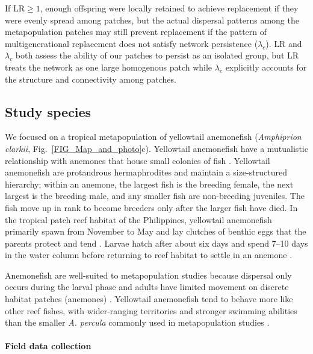 \documentclass[12pt, oneside]{article}   	%
\begin{document}
If $\text{LR} \geq 1$, enough offspring were locally retained to achieve replacement if they were evenly spread among patches, but the actual dispersal patterns among the metapopulation patches may still prevent replacement if the pattern of multigenerational replacement does not satisfy network persistence ($\lambda_c$). LR and $\lambda_c$ both assess the ability of our patches to persist as an isolated group, but LR treats the network as one large homogenous patch while $\lambda_c$ explicitly accounts for the structure and connectivity among patches.  

\subsection*{Study species}

We focused on a tropical metapopulation of yellowtail anemonefish (\textit{Amphiprion clarkii}, Fig.\ \ref{FIG_Map_and_photo}c). Yellowtail anemonefish have a mutualistic relationship with anemones that house small colonies of fish \citep{buston2003social, fautin1992field}. Yellowtail anemonefish are protandrous hermaphrodites and maintain a size-structured hierarchy; within an anemone, the largest fish is the breeding female, the next largest is the breeding male, and any smaller fish are non-breeding juveniles. The fish move up in rank to become breeders only after the larger fish have died. In the tropical patch reef habitat of the Philippines, yellowtail anemonefish primarily spawn from November to May and lay clutches of benthic eggs that the parents protect and tend \citep{ochi1989mating, holtswarth2017fecundity}. Larvae hatch after about six days and spend 7--10 days in the water column before returning to reef habitat to settle in an anemone \citep{fautin1992field}.

Anemonefish are well-suited to metapopulation studies because dispersal only occurs during the larval phase and adults have limited movement on discrete habitat patches (anemones) \citep[e.g.,][]{buston2013marine, salles_coral_2015, almany2017larval}. Yellowtail anemonefish tend to behave more like other reef fishes, with wider-ranging territories and stronger swimming abilities \citep{hattori1991life, ochi1989mating} than the smaller \textit{A. percula} commonly used in metapopulation studies \citep[e.g.,][]{buston2011probability, salles_coral_2015}. %

\paragraph*{Field data collection}
\end{document}
